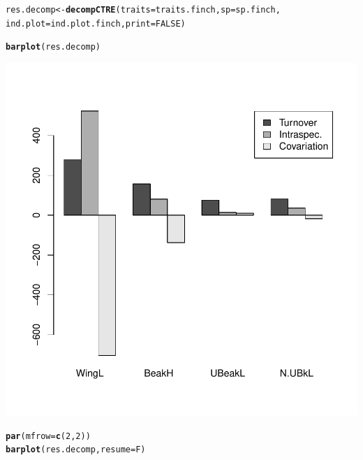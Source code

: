 \documentclass[12pt]{article}\usepackage[]{graphicx}\usepackage[]{color}
\makeatletter
\def\maxwidth{ %
  \ifdim\Gin@nat@width>\linewidth
    \linewidth
  \else
    \Gin@nat@width
  \fi
}
\newcommand{\hlnum}[1]{\textcolor[rgb]{0.686,0.059,0.569}{#1}}%
\newcommand{\hlstd}[1]{\textcolor[rgb]{0.345,0.345,0.345}{#1}}%
\newcommand{\hlkwb}[1]{\textcolor[rgb]{0.69,0.353,0.396}{#1}}%
\newcommand{\hlkwc}[1]{\textcolor[rgb]{0.333,0.667,0.333}{#1}}%
\newcommand{\hlkwd}[1]{\textcolor[rgb]{0.737,0.353,0.396}{\textbf{#1}}}%
\newenvironment{kframe}{%
 \def\at@end@of@kframe{}%
 \ifinner\ifhmode%
  \def\at@end@of@kframe{\end{minipage}}%
  \begin{minipage}{\columnwidth}%
 \fi\fi%
 \def\FrameCommand##1{\hskip\@totalleftmargin \hskip-\fboxsep
 \colorbox{shadecolor}{##1}\hskip-\fboxsep
     \hskip-\linewidth \hskip-\@totalleftmargin \hskip\columnwidth}%
 \MakeFramed {\advance\hsize-\width
   \@totalleftmargin\z@ \linewidth\hsize
   \@setminipage}}%
 {\par\unskip\endMakeFramed%
 \at@end@of@kframe}
\newenvironment{knitrout}{}{} %
\makeatother
\begin{document}
\begin{knitrout}
\color{fgcolor}\begin{kframe}
\begin{alltt}
\hlstd{res.decomp}\hlkwb{<-}\hlkwd{decompCTRE}\hlstd{(}\hlkwc{traits}\hlstd{=traits.finch,} \hlkwc{sp}\hlstd{=sp.finch,}
                           \hlkwc{ind.plot}\hlstd{=ind.plot.finch,} \hlkwc{print}\hlstd{=}\hlnum{FALSE}\hlstd{)}

\hlkwd{barplot}\hlstd{(res.decomp)}
\end{alltt}
\end{kframe}

{\centering \includegraphics[width=\maxwidth]{figure/unnamed-chunk-221} 

}


\begin{kframe}\begin{alltt}
\hlkwd{par}\hlstd{(}\hlkwc{mfrow}\hlstd{=}\hlkwd{c}\hlstd{(}\hlnum{2}\hlstd{,}\hlnum{2}\hlstd{))}
\hlkwd{barplot}\hlstd{(res.decomp,} \hlkwc{resume}\hlstd{=F)}
\end{alltt}
\end{kframe}


\end{knitrout}
\end{document}

